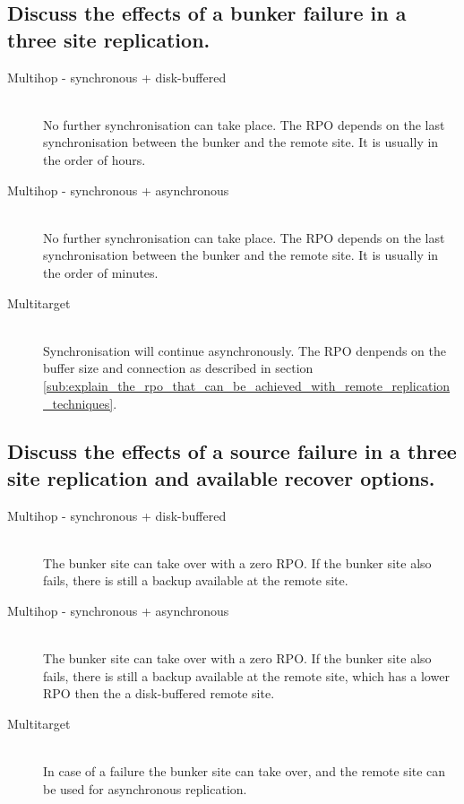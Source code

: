 
\subsection{Discuss the effects of a bunker failure in a three site replication.} %
\label{sub:discuss_the_effects_of_a_bunker_failure}

	\begin{description}
		\item[Multihop - synchronous + disk-buffered] \hfill \\
			No further synchronisation can take place.
			The RPO depends on the last synchronisation between the bunker
			and the remote site.
			It is usually in the order of hours.
		\item[Multihop - synchronous + asynchronous] \hfill \\
			No further synchronisation can take place.
			The RPO depends on the last synchronisation between the bunker
			and the remote site.
			It is usually in the order of minutes.
		\item[Multitarget] \hfill \\
			Synchronisation will continue asynchronously.
			The RPO denpends on the buffer size and connection
			as described in section \ref{sub:explain_the_rpo_that_can_be_achieved_with_remote_replication_techniques}.
	\end{description}


\subsection{Discuss the effects of a source failure in a three site replication and available recover options.} %
\label{sub:discuss_the_effects_of_a_source_failure_in_a_three_site_replication_and_available_recover_options}

	\begin{description}
		\item[Multihop - synchronous + disk-buffered] \hfill \\
			The bunker site can take over with a zero RPO.
			If the bunker site also fails,
			there is still a backup available at the remote site.
		\item[Multihop - synchronous + asynchronous] \hfill \\
			The bunker site can take over with a zero RPO.
			If the bunker site also fails,
			there is still a backup available at the remote site,
			which has a lower RPO then the a disk-buffered remote site.
		\item[Multitarget] \hfill \\
			In case of a failure the bunker site can take over,
			and the remote site can be used for asynchronous replication.
	\end{description}


